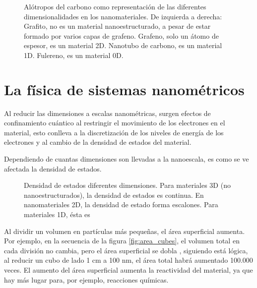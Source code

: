 \begin{figure}
	\centering
	\caption{Alótropos del carbono como representación de las diferentes dimensionalidades en los nanomateriales. De izquierda a derecha: Grafito, no es un material nanoestructurado, a pesar de estar formado por varios capas de grafeno. Grafeno, solo un átomo de espesor, es un material 2D. Nanotubo de carbono, es un material 1D. Fulereno, es un material 0D.}
	\label{fig:carbon_allotropes}
\end{figure}

\section*{La física de sistemas nanométricos}


Al reducir las dimensiones a escalas nanométricas, surgen efectos de confinamiento cuántico al restringir el movimiento de los electrones en el material, esto conlleva a la discretización de los niveles de energía de los electrones y al cambio de la densidad de estados del material. 


Dependiendo de cuantas dimensiones son llevadas a la nanoescala, es como se ve afectada la densidad de estados.

\begin{figure}[h!]
	\centering
	\caption{Densidad de estados diferentes dimensiones. Para materiales 3D (no nanoestructurados), la densidad de estados es continua. En nanomateriales 2D, la densidad de estado forma escalones. Para materiales 1D, ésta es}
	\label{fig:DoE}
\end{figure}

Al dividir un volumen en partículas más pequeñas, el área superficial aumenta. Por ejemplo, en la secuencia de la figura \ref{fig:area_cubes}, el volumen total en cada división no cambia, pero el área superficial se dobla \footnotemark, siguiendo está lógica, al reducir un cubo de lado 1 cm a 100 nm, el área total habrá aumentado 100.000 veces. El aumento del área superficial aumenta la reactividad del material, ya que hay más lugar para, por ejemplo, reacciones químicas.


